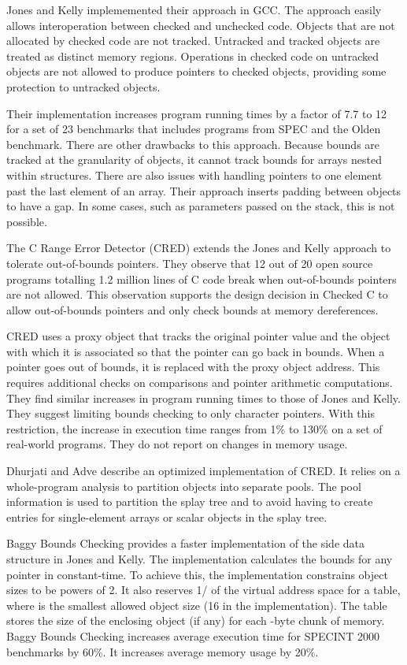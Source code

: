 Jones and Kelly implememented their approach in GCC.   The approach easily allows
interoperation between checked and unchecked code.  Objects that are not allocated by
checked code are not tracked.  Untracked and tracked objects are treated as distinct memory regions.  Operations in checked code on untracked objects are not allowed to produce pointers to checked objects, providing some protection to untracked objects.  

Their implementation increases program running
times by a factor of 7.7 to 12 \cite{Nagarakatte2009} for  a set of
23 benchmarks that includes programs from SPEC and the Olden benchmark.
There are other drawbacks to this approach.
Because bounds are tracked at the granularity of objects, it
cannot track bounds for arrays nested within structures. There are also
issues with handling pointers to one element past the last element of
an array.  Their approach inserts padding between objects to have a gap.  In some
cases, such as parameters passed on the stack, this is not possible.

The C Range Error Detector (CRED) \cite{Ruwase2004} extends the Jones and Kelly
approach to tolerate out-of-bounds pointers.  They observe that 12 out of
20 open source programs totalling 1.2 million lines of C code break when
out-of-bounds pointers are not allowed.   This observation supports the
design decision in Checked C to allow out-of-bounds pointers and only
check bounds at memory dereferences.

CRED uses a proxy object that
tracks the original pointer value and the object with which it is associated
so that the pointer can go back in bounds.  When a pointer goes out of
bounds, it is replaced with the proxy object address.  This requires
additional checks on comparisons and pointer arithmetic computations.
They find similar increases in program running times to those of Jones and
Kelly.  They suggest
limiting bounds checking to only character pointers. With this restriction,
the increase in execution time  ranges from 1\% to 130\% on a set of real-world
programs.  They do not report on changes in memory usage.

Dhurjati and Adve \cite{Dhurjati2006} describe an optimized implementation of
CRED.  It relies on a whole-program analysis to partition
objects into separate pools.  The pool information is used to partition
the splay tree and  to avoid having to create entries for single-element arrays 
or scalar objects in the splay tree.

Baggy Bounds Checking \cite{Akritidis2008} provides a faster implementation
of the side data structure in Jones and Kelly.  The implementation 
calculates the bounds for any pointer in constant-time.   To achieve this,
the implementation constrains object sizes to be powers of 2.  It also reserves 
1/ of the virtual address space for a table, where  is the smallest 
allowed object size (16 in the implementation).  The table stores the size of the
enclosing object (if any) for each -byte chunk of memory.   Baggy Bounds 
Checking increases average execution time for SPECINT 2000 benchmarks by 60\%. 
It increases average memory usage by 20\%.

